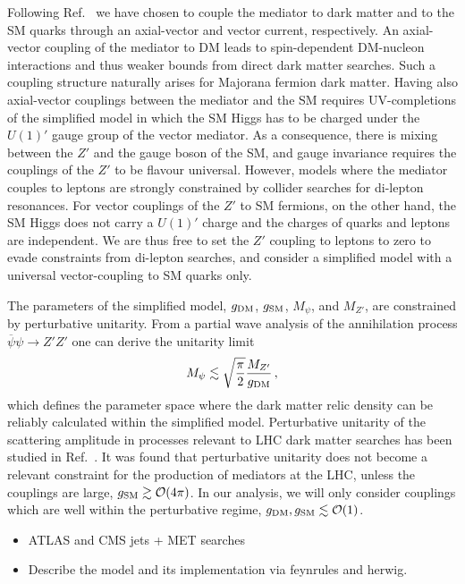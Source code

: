 \documentclass[floatfix]{article}
\begin{document}
Following Ref.~\cite{Kahlhoefer:2015bea} we have chosen to couple the mediator to 
dark matter and to the SM quarks through an axial-vector and vector current, respectively. An axial-vector coupling of the 
mediator to DM leads to spin-dependent DM-nucleon interactions and thus weaker bounds from direct dark matter searches. 
Such a coupling structure naturally arises for Majorana fermion dark matter. Having also axial-vector couplings between
the mediator and the SM  requires UV-completions of the simplified model in which the SM Higgs has to be charged under 
the $U(1)'$ gauge group of the vector mediator. As a consequence, there is mixing between the $Z'$ and the gauge boson of the SM, and gauge invariance 
requires the couplings of the $Z'$ to be flavour universal. However, models where the mediator couples to leptons 
are strongly constrained by collider searches for di-lepton resonances. For vector couplings of the $Z'$ to  SM fermions, on the other hand, 
the SM Higgs does not carry a $U(1)'$ charge and the charges of quarks and leptons are independent. We are thus free to set the 
$Z'$ coupling to leptons to zero to evade constraints from di-lepton searches, and consider a simplified model with a universal vector-coupling 
to SM quarks only. 

The parameters of the simplified model, $g_{\rm DM}$, $g_{\rm SM}$, $M_\psi$, and $M_{Z'}$, are constrained by perturbative unitarity. 
From a partial wave analysis of the annihilation process $\overline{\psi}\psi \to Z' Z'$ one can derive the unitarity limit~\cite{Kahlhoefer:2015bea}
\begin{equation}
M_\psi \lesssim \sqrt{\frac{\pi}{2}} \frac{M_{Z'}}{g_{\rm DM}}\,,
\end{equation}
which defines the parameter space where the dark matter relic density can be reliably calculated within the simplified model. 
Perturbative unitarity of the scattering amplitude in processes relevant to LHC dark matter searches has been studied in Ref.~\cite{Englert:2016joy}. 
It was found that perturbative unitarity does not become a relevant constraint for the production of mediators at the LHC, unless 
the couplings are large, $g_{\rm SM} \gtrsim {\cal O}(4\pi)$. In our analysis, we will only consider couplings which are well within the 
perturbative regime, $g_{\rm DM}, g_{\rm SM} \lesssim {\cal O}(1)$. 

\begin{itemize}
\item ATLAS and CMS jets + MET searches
\item Describe the model and its implementation via feynrules and herwig.
\end{itemize}
\end{document}

